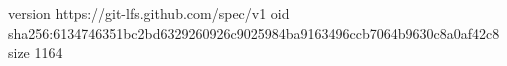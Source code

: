 version https://git-lfs.github.com/spec/v1
oid sha256:6134746351bc2bd6329260926c9025984ba9163496ccb7064b9630c8a0af42c8
size 1164
